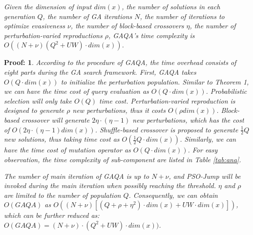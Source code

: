 \documentclass[lettersize,journal]{IEEEtran}
\begin{document}
	
	\begin{Theorem1} 
		\textit{Given the dimension of input $dim(x)$, the number of solutions in each generation $Q$, the number of GA iterations $N$, the number of iterations to optimize evasiveness $\nu$, the number of block-based crossovers $\eta$, the number of perturbation-varied reproductions $\rho$, GAQA's time complexity is $O((N+\nu)(Q^2+UW)\cdot dim(x))$.}
		\label{Theorem2}
	\end{Theorem1}
	
	\theoremstyle{nonumberplain}
	\theorembodyfont{\normalfont}
	\theoremsymbol{\mbox{$\Box$}}
	\newtheorem{pr2}{Proof:}
	\begin{pr2} 
		
		According to the procedure of GAQA, the time overhead consists of eight parts during the GA search framework. First, GAQA takes $O(Q \cdot dim(x))$ to initialize the perturbation population. Similar to Theorem 1, we can have the time cost of query evaluation as $O(Q\cdot dim(x))$. Probabilistic selection will only take $O(Q)$ time cost. Perturbation-varied reproduction is designed to generate $\rho$ new perturbations, thus it costs $O(\rho dim(x))$. Block-based crossover will generate $2\eta\cdot(\eta-1)$ new perturbations, which has the cost of $O(2\eta\cdot(\eta-1)dim(x))$. Shuffle-based crossover is proposed to generate $\frac{1}{2}Q$ new solutions, thus taking time cost as $O(\frac{1}{2}Q\cdot dim(x))$. Similarly, we can have the time cost of mutation operator as $O(Q\cdot dim(x))$. For easy observation, the time complexity of sub-component are listed in Table \ref{tab:ana}.
		
		The number of main iteration of GAQA is up to $N+\nu$, and PSO-Jump will be invoked during the main iteration when possibly reaching the threshold. $\eta$ and $\rho$ are limited to the number of population $Q$. Consequently, we can obtain $O(GAQA)$ as $O((N+\nu)[(Q+\rho+\eta^2)\cdot dim(x)+UW\cdot dim(x)])$,  which can be further reduced as: $O(GAQA)=(N+\nu)\cdot (Q^2 + UW)\cdot dim(x))$.
		\theoremsymbol{\mbox{$\Box$}}
	\end{pr2}
	
\end{document}
